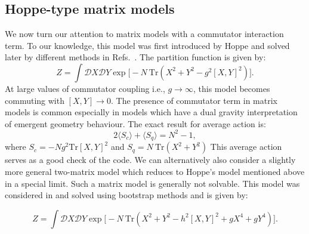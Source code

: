 \documentclass[11pt]{article}
\begin{document}
\subsection{\label{subsec:Hoppe}Hoppe-type matrix models}
We now turn our attention to matrix models with a commutator interaction term. 
To our knowledge, this model 
was first introduced by Hoppe \cite{Hoppe:1982en} and solved later by different methods in 
Refs.~\cite{Kazakov:1998ji,Berenstein:2008eg}.
The partition function is given by:
\begin{equation}
Z = \int \mathcal{D}X \mathcal{D}Y \exp \Big[-N ~ \mbox{Tr} (X^2 + Y^2 - g^2 [X,Y]^2) \Big]. 
\end{equation}
At large values of commutator coupling i.e., $ g \to \infty$, this model becomes commuting with 
$ [X,Y] \to 0$. The presence of commutator term in matrix models is common especially in 
models which have a dual gravity interpretation of emergent geometry behaviour. 
The exact result for average action is:
\begin{equation}
	2 \langle S_{c} \rangle + \langle S_{q}  \rangle = N^2 - 1, 
\end{equation}
where $ S_{c} = -Ng^2 \mbox{Tr}[X,Y]^2$  and 
$ S_{q} = N~\mbox{Tr} (X^2 + Y^2) $
This average action serves as a good check of the code. We can alternatively also consider a slightly more 
general two-matrix model which reduces to Hoppe's model mentioned above in a special limit. 
Such a matrix model is generally not solvable. This model was considered in \cite{Kazakov:2021lel} and 
solved using bootstrap methods and is given by:

\begin{equation}
\label{eq:GHM1} 
Z = \int \mathcal{D}X \mathcal{D}Y \exp \Big[-N ~ \mbox{Tr} (X^2 + Y^2 - h^2 [X,Y]^2 + gX^4 + gY^4) \Big].	
\end{equation}
\end{document}
